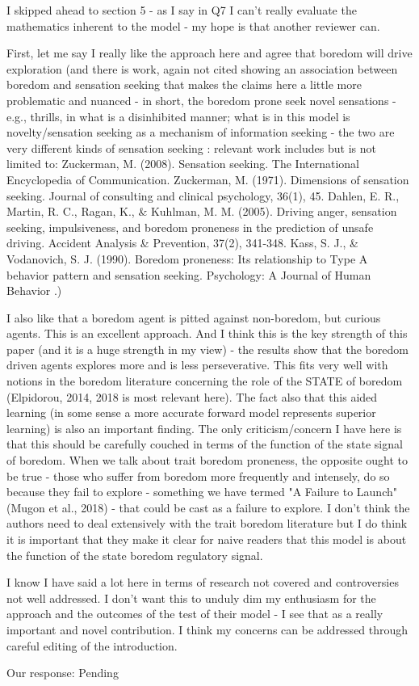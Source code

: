 \documentclass[utf8]{article}
\begin{document}
        I skipped ahead to section 5 - as I say in Q7 I can't really evaluate the mathematics inherent to the model - my hope is that another reviewer can.
        
        First, let me say I really like the approach here and agree that boredom will drive exploration (and there is work, again not cited showing an association between boredom and sensation seeking that makes the claims here a little more problematic and nuanced - in short, the boredom prone seek novel sensations - e.g., thrills, in what is a disinhibited manner; what is in this model is novelty/sensation seeking as a mechanism of information seeking - the two are very different kinds of sensation seeking : relevant work includes but is not limited to: Zuckerman, M. (2008). Sensation seeking. The International Encyclopedia of Communication. Zuckerman, M. (1971). Dimensions of sensation seeking. Journal of consulting and clinical psychology, 36(1), 45. Dahlen, E. R., Martin, R. C., Ragan, K., \& Kuhlman, M. M. (2005). Driving anger, sensation seeking, impulsiveness, and boredom proneness in the prediction of unsafe driving. Accident Analysis \& Prevention, 37(2), 341-348. Kass, S. J., \& Vodanovich, S. J. (1990). Boredom proneness: Its relationship to Type A behavior pattern and sensation seeking. Psychology: A Journal of Human Behavior .)
        
        I also like that a boredom agent is pitted against non-boredom, but curious agents. This is an excellent approach. And I think this is the key strength of this paper (and it is a huge strength in my view) - the results show that the boredom driven agents explores more and is less perseverative. This fits very well with notions in the boredom literature concerning the role of the STATE of boredom (Elpidorou, 2014, 2018 is most relevant here). The fact also that this aided learning (in some sense a more accurate forward model represents superior learning) is also an important finding. The only criticism/concern I have here is that this should be carefully couched in terms of the function of the state signal of boredom. When we talk about trait boredom proneness, the opposite ought to be true - those who suffer from boredom more frequently and intensely, do so because they fail to explore - something we have termed "A Failure to Launch" (Mugon et al., 2018) - that could be cast as a failure to explore. I don't think the authors need to deal extensively with the trait boredom literature but I do think it is important that they make it clear for naive readers that this model is about the function of the state boredom regulatory signal.
        
        I know I have said a lot here in terms of research not covered and controversies not well addressed. I don't want this to unduly dim my enthusiasm for the approach and the outcomes of the test of their model - I see that as a really important and novel contribution. I think my concerns can be addressed through careful editing of the introduction.
        
        
        Our response:
        Pending


    
    	
\end{document}
